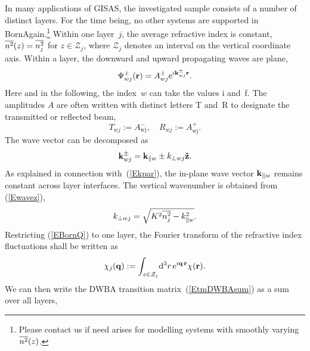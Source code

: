 In many applications of GISAS,
the investigated sample consists of a number of distinct layers.
For the time being,
no other systems are supported in BornAgain.\footnote
{Please contact us if need arises for modelling systems with
smoothly varying~$\overline{n^2}(z)$.
%
}
Within one layer~$j$, the average refractive index is constant,
$\overline{n^2}(z)=\overline{n_j^2}$ for $z\in\mathcal{Z}_j$, where
$\mathcal{Z}_j$ denotes an interval on the vertical coordinate axis.
Within a layer,
the downward and upward propagating waves are plane,
\begin{equation}
  \Psi^\pm_{wj}(\mathbf{r})=A^\pm_{wj}{\rm e}^{i\mathbf{k}^\pm_{wj}\mathbf{r}}.
\end{equation}
%
%
%
Here and in the following,
the index~$w$ can take the values i and~f.
The amplitudes $A$ are often written with distinct letters
T and~R to designate the transmitted or reflected beam,
\begin{equation}
  T_{wj} := A^-_\text{wj},\quad
  R_{wj} := A^+_\text{wj}.
\end{equation}
The wave vector can be decomposed as
\begin{equation}
  \mathbf{k}^\pm_{wj}= \mathbf{k}_{\parallel w} \pm k_{\perp wj}\mathbf{\hat z}.
\end{equation}
As explained in connection with~(\ref{Ekpar}),
the in-plane wave vector $\mathbf{k}_{\parallel w}$ remains constant
across layer interfaces.
The vertical wavenumber is obtained from (\ref{Ewavez}),
\begin{equation}
  k_{\perp wj} = \sqrt{K^2 \overline{n_j^2} - k_{\parallel w}^2}.
\end{equation}
Restricting (\ref{EBornQ}) to one layer,
the Fourier transform of the refractive index fluctuations
shall be written as
\begin{equation}\label{Echij}
  \chi_j(\mathbf{q})
  := \int_{z\in\mathcal{Z}_j}\!{\rm d}^3r\, {\rm e}^{i\mathbf{q}\,\mathbf{r}}\chi(\mathbf{r}).
\end{equation}
We can then write the DWBA transition matrix~(\ref{EtmDWBAsum}) as
a sum over all layers,
%

